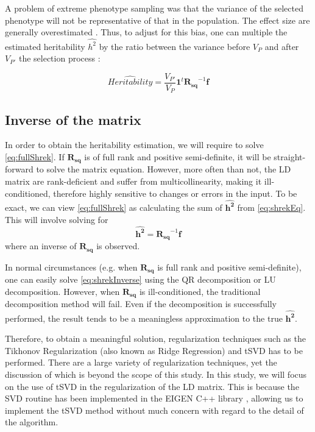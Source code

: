 			A problem of extreme phenotype sampling was that the variance of the selected phenotype will not be representative of that in the population.
			The effect size are generally overestimated \citep{Guey2011}. 
			Thus, to adjust for this bias, one can multiple the estimated heritability $\hat{h^2}$ by the ratio between the variance before $V_P$ and after $V_{P'}$ the selection process \citep{Sham2014}:
			
			\begin{equation}
			\hat{Heritability} = \frac{V_{P'}}{V_P}\boldsymbol{1}^t\boldsymbol{R_{sq}}^{-1}\boldsymbol{f}
			\label{eq:extremeShrek}
			\end{equation}
			
		\subsection{Inverse of the  matrix}
			In order to obtain the heritability estimation, we will require to solve \cref{eq:fullShrek}. 
			If $\boldsymbol{R_{sq}}$ is of full rank and positive semi-definite, it will be straight-forward to solve the matrix equation.
			However, more often than not, the \gls{LD} matrix are rank-deficient and suffer from multicollinearity, making it ill-conditioned, therefore highly sensitive to changes or errors in the input.
			To be exact, we can view \cref{eq:fullShrek} as calculating the sum of $\boldsymbol{\hat{h^2}}$ from  \cref{eq:shrekEq}.
			This will involve solving for
			\begin{equation}
			\boldsymbol{\hat{h^2}} = \boldsymbol{R_{sq}}^{-1}\boldsymbol{f}
			\label{eq:shrekInverse}
			\end{equation}
			where an inverse of $\boldsymbol{R_{sq}}$ is observed. 
			
			In normal circumstances (e.g. when $\boldsymbol{R_{sq}}$ is full rank and positive semi-definite), one can easily solve \cref{eq:shrekInverse} using the QR decomposition or LU decomposition.
			However, when $\boldsymbol{R_{sq}}$ is ill-conditioned, the traditional decomposition method will fail.
			Even if the decomposition is successfully performed, the result tends to be a meaningless approximation to the true $\boldsymbol{\hat{h^2}}$. 
			
			Therefore, to obtain a meaningful solution, regularization techniques such as the Tikhonov Regularization (also known as Ridge Regression) and \gls{tSVD} has to be performed\citep{Neumaier1998}. 
			There are a large variety of regularization techniques, yet the discussion of which is beyond the scope of this study. 
			In this study, we will focus on the use of \gls{tSVD} in the regularization of the \gls{LD} matrix.
			This is because the \gls{SVD} routine has been implemented in the EIGEN C++ library \citep{eigenweb}, allowing us to implement the \gls{tSVD} method without much concern with regard to the detail of the algorithm. 
			
